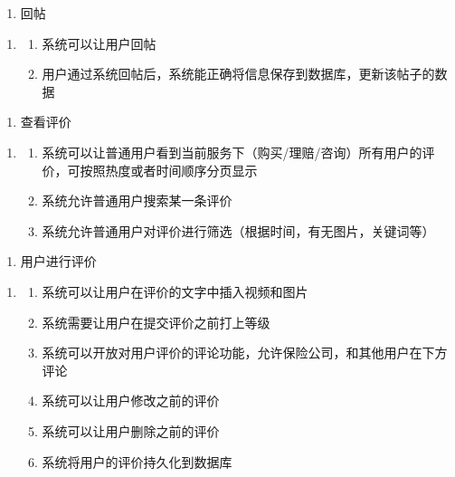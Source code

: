 \documentclass[a4paper]{ctexart}
\begin{document}
\begin{enumerate}[label=UR7.]
  \item 回帖
\end{enumerate}
\begin{enumerate}[label=SR12.]
  \item 
  \begin{enumerate}[label=\arabic*).]
    \item 系统可以让用户回帖
    \item 用户通过系统回帖后，系统能正确将信息保存到数据库，更新该帖子的数据
  \end{enumerate}
\end{enumerate}

\begin{enumerate}[label=UR8.]
  \item 查看评价
\end{enumerate}
\begin{enumerate}[label=SR13.]
  \item 
  \begin{enumerate}[label=\arabic*).]
    \item 系统可以让普通用户看到当前服务下（购买/理赔/咨询）所有用户的评价，可按照热度或者时间顺序分页显示
    \item 系统允许普通用户搜索某一条评价
    \item 系统允许普通用户对评价进行筛选（根据时间，有无图片，关键词等）
  \end{enumerate}
\end{enumerate}

\begin{enumerate}[label=UR9.]
  \item 用户进行评价
\end{enumerate}
\begin{enumerate}[label=SR14.]
  \item 
  \begin{enumerate}[label=\arabic*).]
    \item 系统可以让用户在评价的文字中插入视频和图片
    \item 系统需要让用户在提交评价之前打上等级
    \item 系统可以开放对用户评价的评论功能，允许保险公司，和其他用户在下方评论
    \item 系统可以让用户修改之前的评价
    \item 系统可以让用户删除之前的评价
    \item 系统将用户的评价持久化到数据库
  \end{enumerate}
\end{enumerate}
\end{document}
